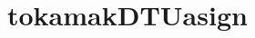 \appendix
\appendixpage
\addappheadtotoc
\section{tokamakDTU\textunderscore asign}
\inputminted[bgcolor=Black,linenos=true]{python}{Listings/IterateTokamakDTU.m}
